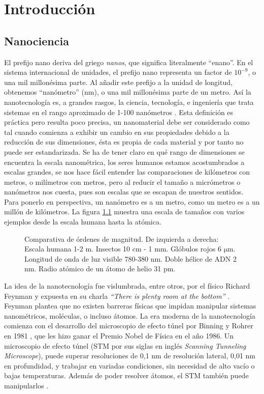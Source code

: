 \chapter{Introducción}
\section{Nanociencia}
El prefijo nano deriva del griego \emph{nanos}, que significa literalmente ``enano''. En el sistema internacional de unidades, el prefijo nano representa un factor de $\mathrm{10^{-9}}$, o una mil millonésima parte. Al añadir este prefijo a la unidad de longitud, obtenemos ``nanómetro'' (nm), o una mil millonésima parte de un metro. Así la nanotecnología es, a grandes rasgos, la ciencia, tecnología, e ingeniería que trata sistemas en el rango aproximado de 1-100 nanómetros \citep{Haick2013,Gressler2013}. Esta definición es práctica pero resulta poco precisa, un nanomaterial debe ser considerado como tal cuando comienza a exhibir un cambio en sus propiedades debido a la reducción de sus dimensiones, ésta es propia de cada material y por tanto no puede ser estandarizada. Se ha de tener claro en qué rango de dimensiones se encuentra la escala nanométrica, los seres humanos estamos acostumbrados a escalas grandes, se nos hace fácil entender las comparaciones de kilómetros con metros, o milímetros con metros, pero al reducir el tamaño a micrómetros o nanómetros nos cuesta, pues son escalas que se escapan de nuestros sentidos. Para ponerlo en perspectiva, un nanómetro es a un metro, como un metro es a un millón de kilómetros. La figura \ref{fig:scale} muestra una escala de tamaños con varios ejemplos desde la escala humana hasta la atómica.

\begin{figure}[h!]
	\centering
	\caption[Comparativa de ódenes de magnitud desde metros hasta picometros]{Comparativa de órdenes de magnitud. De izquierda a derecha: Escala humana 1-2 m. Insectos 10 cm - 1 mm. Glóbulos rojos 6 $\mathrm{\mu}$m. Longitud de onda de luz visible 780-380 nm. Doble hélice de ADN 2 nm. Radio atómico de un átomo de helio 31 pm.}
\label{fig:scale}
\end{figure}

La idea de la nanotecnología fue vislumbrada, entre otros, por el físico Richard Feynman y expuesta en su charla \emph{``There is plenty room at the bottom''} \citep{Feynman1960}. Feynman plantea que no existen barreras físicas que impidan manipular sistemas nanométricos, moléculas, o incluso átomos. La era moderna de la nanotecnología comienza con el desarrollo del microscopio de efecto túnel por Binning y Rohrer en 1981 \citep{Binnig1982}, que les hizo ganar el Premio Nobel de Física en el año 1986. Un microscopio de efecto túnel (STM por sus siglas en inglés \emph{Scanning Tunneling Microscope}), puede superar resoluciones de 0,1 nm de resolución lateral, 0,01 nm en profundidad, y trabajar en variadas condiciones, sin necesidad de alto vacío o bajas temperaturas. Además de poder resolver átomos, el STM también puede manipularlos \citep{Chen2008}.

